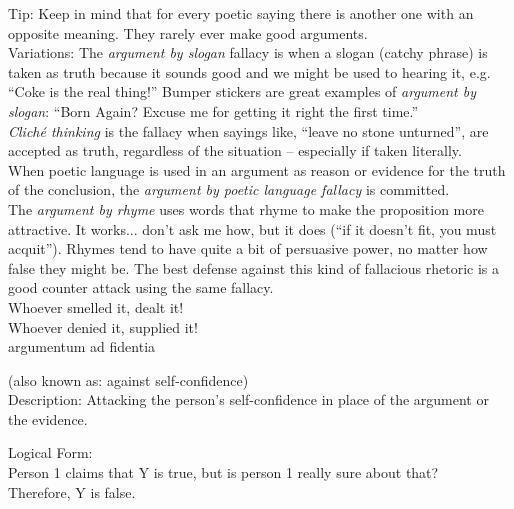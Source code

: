 \documentclass[a4paper,12pt,single,pdftex]{scrbook}
\begin{document}
    
      Tip: Keep in mind that for every poetic saying there is another one with an opposite meaning.  They rarely ever make good arguments.
    \\

    
      Variations: The {\it argument by slogan} fallacy is when a slogan (catchy phrase) is taken as truth because it sounds good and we might be used to hearing it, e.g. “Coke is the real thing!”  Bumper stickers are great examples of {\it argument by slogan}: “Born Again? Excuse me for getting it right the first time.”
    \\

    
      {\it Cliché thinking} is the fallacy when sayings like, “leave no stone unturned”, are accepted as truth, regardless of the situation -- especially if taken literally.
    \\

    
      When poetic language is used in an argument as reason or evidence for the truth of the conclusion, the {\it argument by poetic language fallacy}  is committed.
    \\

    
      The {\it argument by rhyme} uses words that rhyme to make the proposition more attractive.  It works... don’t ask me how, but it does (“if it doesn’t fit, you must acquit”).  Rhymes tend to have quite a bit of persuasive power, no matter how false they might be.  The best defense against this kind of fallacious rhetoric is a good counter attack using the same fallacy.
    \\

    
      Whoever smelled it, dealt it!
    \\

    
      Whoever denied it, supplied it!
    \\

  

argumentum ad fidentia
    
      (also known as: against self-confidence)
    \\

  
    Description: Attacking the person’s self-confidence in place of the argument or the evidence.

    
      Logical Form:
    \\

    
      Person 1 claims that Y is true, but is person 1 really sure about that?
    \\

    
      Therefore, Y is false.
    \\
\end{document}
